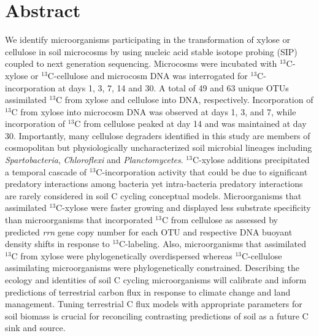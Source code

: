 \section{Abstract} We identify microorganisms participating in the
transformation of xylose or cellulose in soil microcosms by using nucleic acid
stable isotope probing (SIP) coupled to next generation sequencing. Microcosms
were incubated with $^{13}$C-xylose or $^{13}$C-cellulose and microcosm DNA was
interrogated for $^{13}$C-incorporation at days 1, 3, 7,
14 and 30. A total of 49 and 63 unique OTUs assimilated $^{13}$C from xylose
and cellulose into DNA, respectively. Incorporation of $^{13}$C from xylose
into microcosm DNA was observed at days 1, 3, and 7, while incorporation of
$^{13}$C from cellulose peaked at day 14 and was maintained at day 30.
Importantly, many cellulose degraders identified in this study are members of
cosmopolitan but physiologically uncharacterized soil microbial lineages
including \textit{Spartobacteria}, \textit{Chloroflexi} and
\textit{Planctomycetes}. $^{13}$C-xylose additions precipitated a temporal
cascade of $^{13}$C-incorporation activity that could be due to significant
predatory interactions among bacteria yet intra-bacteria predatory interactions
are rarely considered in soil C cycling conceptual models. Microorganisms that
assimilated $^{13}$C-xylose were faster growing and displayed less substrate
specificity than microorganisms that incorporated $^{13}$C from cellulose as
assessed by predicted \textit{rrn} gene copy number for each OTU and respective DNA
buoyant density shifts in response to $^{13}$C-labeling. Also, microorganisms
that assimilated $^{13}$C from xylose were phylogenetically overdispersed
whereas $^{13}$C-cellulose assimilating microorganisms were phylogenetically
constrained. Describing the ecology and identities of soil C cycling
microorganisms will calibrate and inform predictions of terrestrial carbon flux
in response to climate change and land management. Tuning terrestrial C flux
models with appropriate parameters for soil biomass is crucial for reconciling
contrasting predictions of soil as a future C sink and source.
